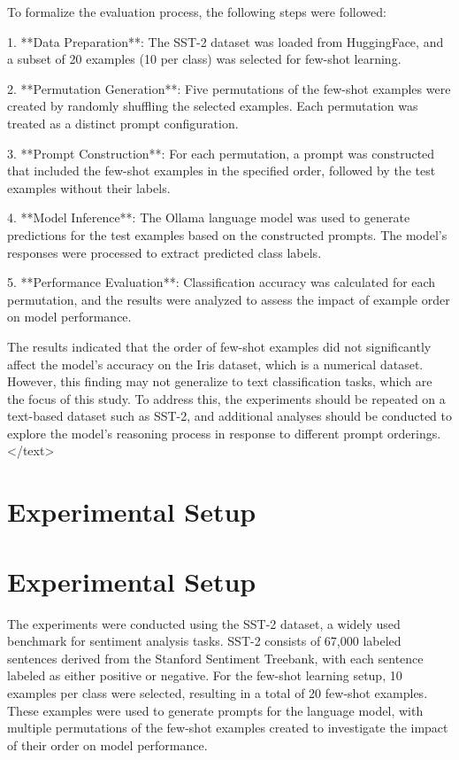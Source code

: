 \documentclass{article}
\begin{document}
To formalize the evaluation process, the following steps were followed:

1. **Data Preparation**: The SST-2 dataset was loaded from HuggingFace, and a subset of 20 examples (10 per class) was selected for few-shot learning.

2. **Permutation Generation**: Five permutations of the few-shot examples were created by randomly shuffling the selected examples. Each permutation was treated as a distinct prompt configuration.

3. **Prompt Construction**: For each permutation, a prompt was constructed that included the few-shot examples in the specified order, followed by the test examples without their labels.

4. **Model Inference**: The Ollama language model was used to generate predictions for the test examples based on the constructed prompts. The model's responses were processed to extract predicted class labels.

5. **Performance Evaluation**: Classification accuracy was calculated for each permutation, and the results were analyzed to assess the impact of example order on model performance.

The results indicated that the order of few-shot examples did not significantly affect the model's accuracy on the Iris dataset, which is a numerical dataset. However, this finding may not generalize to text classification tasks, which are the focus of this study. To address this, the experiments should be repeated on a text-based dataset such as SST-2, and additional analyses should be conducted to explore the model's reasoning process in response to different prompt orderings.
</text>
\section{Experimental Setup}
\section{Experimental Setup}

The experiments were conducted using the SST-2 dataset, a widely used benchmark for sentiment analysis tasks. SST-2 consists of 67,000 labeled sentences derived from the Stanford Sentiment Treebank, with each sentence labeled as either positive or negative. For the few-shot learning setup, 10 examples per class were selected, resulting in a total of 20 few-shot examples. These examples were used to generate prompts for the language model, with multiple permutations of the few-shot examples created to investigate the impact of their order on model performance.
\end{document}
